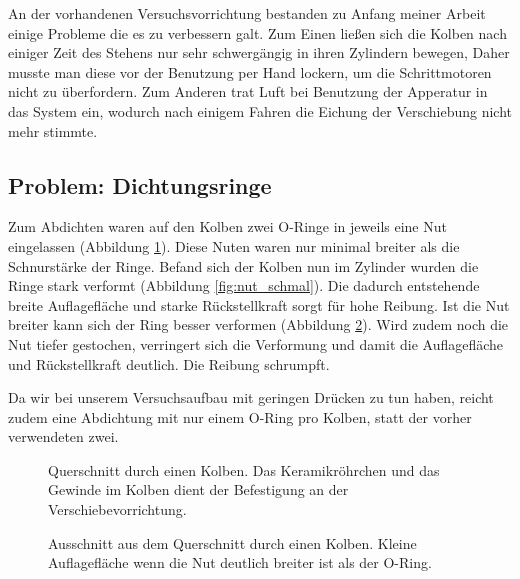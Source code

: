 \documentclass[
    11pt,
    ngerman
]{scrbook}
\begin{document}
An der vorhandenen Versuchsvorrichtung bestanden zu Anfang meiner Arbeit einige
Probleme die es zu verbessern galt. Zum Einen ließen sich die Kolben nach
einiger Zeit des Stehens nur sehr schwergängig in ihren Zylindern bewegen,
Daher musste man diese vor der Benutzung per Hand lockern, um die
Schrittmotoren nicht zu überfordern. Zum Anderen trat Luft bei Benutzung der
Apperatur in das System ein, wodurch nach einigem Fahren die Eichung der
Verschiebung nicht mehr stimmte.  

\subsection{Problem: Dichtungsringe}

Zum Abdichten waren auf den Kolben zwei O-Ringe in jeweils eine Nut
eingelassen (Abbildung \ref{fig:kolben}). Diese Nuten waren nur minimal
breiter als die Schnurstärke der Ringe. Befand sich der Kolben nun im Zylinder
wurden die Ringe stark verformt (Abbildung \ref{fig:nut_schmal}). Die dadurch
entstehende breite Auflagefläche und starke Rückstellkraft sorgt für hohe
Reibung. Ist die Nut breiter kann sich der Ring besser verformen (Abbildung
\ref{fig:nut_breit}). Wird zudem noch die Nut tiefer gestochen, verringert
sich die Verformung und damit die Auflagefläche und Rückstellkraft deutlich.
Die Reibung schrumpft.

Da wir bei unserem Versuchsaufbau mit geringen Drücken zu tun haben, reicht
zudem eine Abdichtung mit nur einem O-Ring pro Kolben, statt der vorher
verwendeten zwei.

\begin{figure}[htbp]
    \centering
    
    \caption{%
        Querschnitt durch einen Kolben. Das Keramikröhrchen und das Gewinde im Kolben dient der Befestigung an der Verschiebevorrichtung.
    }
    \label{fig:kolben}
\end{figure}


\begin{figure}[htbp]
\begin{minipage}[htbp]{.45\textwidth}
    \centering
    
    \caption{%
        Ausschnitt aus dem Querschnitt durch einen Kolben. Breite Auflagefläche des O-Rings bei zu schmaler Nut.
    }
    \label{fig:nut_schmal}
\end{minipage}
\hfill
\begin{minipage}[htbp]{.45\textwidth}
    \centering
    
    \caption{%
        Ausschnitt aus dem Querschnitt durch einen Kolben. Kleine Auflagefläche wenn die Nut deutlich breiter ist als der O-Ring.
    }
    \label{fig:nut_breit}
\end{minipage}
\end{figure}
\end{document}
